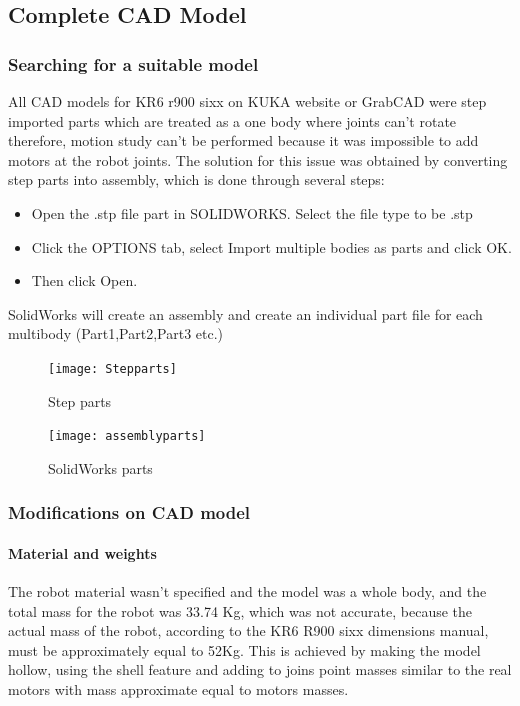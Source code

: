\subsection{Complete CAD Model}

\subsubsection{Searching for a suitable model}
All CAD models for KR6 r900 sixx on KUKA website or GrabCAD were step imported parts which are treated as a one body where joints can’t rotate therefore, motion study can’t be performed because it was impossible to add motors at the robot joints. The solution for this issue was obtained by converting step parts into assembly, which is done through several steps:
\begin{itemize}
	\item Open the .stp file part in SOLIDWORKS.  Select the file type to be .stp
	\item Click the OPTIONS tab, select Import multiple bodies as parts and click OK.
	\item Then click Open.
\end{itemize}
SolidWorks will create an assembly and create an individual part file for each multibody (Part1,Part2,Part3 etc.)
\begin{figure}[H]
	\centering
	\texttt{[image: Stepparts]}
	\caption{Step parts}
\end{figure}

\begin{figure}[H]
	\centering
	\texttt{[image: assemblyparts]}
	\caption{SolidWorks parts}
\end{figure}

\subsubsection{Modifications on CAD model}
\paragraph{Material and weights}
The robot material wasn’t specified and the model was a whole body, and the total mass for the robot was 33.74 Kg, which was not accurate, because the actual mass of the robot, according to the KR6 R900 sixx dimensions manual, must be approximately equal to 52Kg. This is achieved by making the model hollow, using the shell feature and adding to joins point masses similar to the real motors with mass approximate equal to motors masses. 


